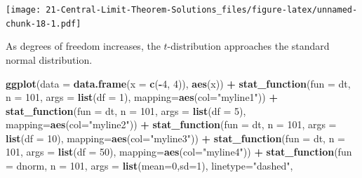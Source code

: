 \documentclass[
]{book}
\newenvironment{Shaded}{\begin{snugshade}}{\end{snugshade}}
\newcommand{\DataTypeTok}[1]{\textcolor[rgb]{0.13,0.29,0.53}{#1}}
\newcommand{\DecValTok}[1]{\textcolor[rgb]{0.00,0.00,0.81}{#1}}
\newcommand{\KeywordTok}[1]{\textcolor[rgb]{0.13,0.29,0.53}{\textbf{#1}}}
\newcommand{\NormalTok}[1]{#1}
\newcommand{\OperatorTok}[1]{\textcolor[rgb]{0.81,0.36,0.00}{\textbf{#1}}}
\newcommand{\StringTok}[1]{\textcolor[rgb]{0.31,0.60,0.02}{#1}}
\begin{document}
\texttt{[image: 21-Central-Limit-Theorem-Solutions\_files/figure-latex/unnamed-chunk-18-1.pdf]}

As degrees of freedom increases, the \(t\)-distribution approaches the standard normal distribution.

\begin{Shaded}
\begin{Highlighting}[]
\KeywordTok{ggplot}\NormalTok{(}\DataTypeTok{data =} \KeywordTok{data.frame}\NormalTok{(}\DataTypeTok{x =} \KeywordTok{c}\NormalTok{(}\OperatorTok{-}\DecValTok{4}\NormalTok{, }\DecValTok{4}\NormalTok{)), }\KeywordTok{aes}\NormalTok{(x)) }\OperatorTok{+}
\StringTok{  }\KeywordTok{stat_function}\NormalTok{(}\DataTypeTok{fun =}\NormalTok{ dt, }\DataTypeTok{n =} \DecValTok{101}\NormalTok{, }
                \DataTypeTok{args =} \KeywordTok{list}\NormalTok{(}\DataTypeTok{df =} \DecValTok{1}\NormalTok{),}
                \DataTypeTok{mapping=}\KeywordTok{aes}\NormalTok{(}\DataTypeTok{col=}\StringTok{"myline1"}\NormalTok{)) }\OperatorTok{+}\StringTok{ }
\StringTok{  }\KeywordTok{stat_function}\NormalTok{(}\DataTypeTok{fun =}\NormalTok{ dt, }\DataTypeTok{n =} \DecValTok{101}\NormalTok{, }
                \DataTypeTok{args =} \KeywordTok{list}\NormalTok{(}\DataTypeTok{df =} \DecValTok{5}\NormalTok{),}
                \DataTypeTok{mapping=}\KeywordTok{aes}\NormalTok{(}\DataTypeTok{col=}\StringTok{"myline2"}\NormalTok{)) }\OperatorTok{+}\StringTok{ }
\StringTok{  }\KeywordTok{stat_function}\NormalTok{(}\DataTypeTok{fun =}\NormalTok{ dt, }\DataTypeTok{n =} \DecValTok{101}\NormalTok{, }
                \DataTypeTok{args =} \KeywordTok{list}\NormalTok{(}\DataTypeTok{df =} \DecValTok{10}\NormalTok{),}
                \DataTypeTok{mapping=}\KeywordTok{aes}\NormalTok{(}\DataTypeTok{col=}\StringTok{"myline3"}\NormalTok{)) }\OperatorTok{+}\StringTok{    }
\StringTok{   }\KeywordTok{stat_function}\NormalTok{(}\DataTypeTok{fun =}\NormalTok{ dt, }\DataTypeTok{n =} \DecValTok{101}\NormalTok{, }
                \DataTypeTok{args =} \KeywordTok{list}\NormalTok{(}\DataTypeTok{df =} \DecValTok{50}\NormalTok{),}
                \DataTypeTok{mapping=}\KeywordTok{aes}\NormalTok{(}\DataTypeTok{col=}\StringTok{"myline4"}\NormalTok{)) }\OperatorTok{+}\StringTok{ }
\StringTok{   }\KeywordTok{stat_function}\NormalTok{(}\DataTypeTok{fun =}\NormalTok{ dnorm, }\DataTypeTok{n =} \DecValTok{101}\NormalTok{, }
                \DataTypeTok{args =} \KeywordTok{list}\NormalTok{(}\DataTypeTok{mean=}\DecValTok{0}\NormalTok{,}\DataTypeTok{sd=}\DecValTok{1}\NormalTok{),}
                \DataTypeTok{linetype=}\StringTok{"dashed"}\NormalTok{,}

\end{Highlighting}
\end{Shaded}
\end{document}

